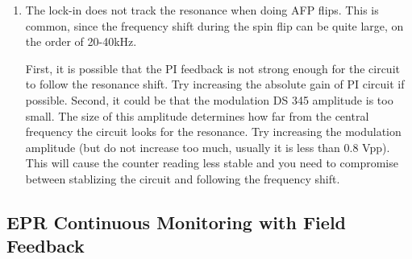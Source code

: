 {\begin{enumerate}
First, it is possible that
the frequency to which you are locked is not the true resonance, or
you are completely out of resonance region.
The solution is again to find manually the resonance, looking for the
most pronounced signal.  

	The problem could also be caused by a wrong lock-in amplifier phase.
Please refer to Section \ref{sec:eprfms}.

	Finally, it could be that the PI Feedback box is improperly set. 
Adjust the gains until the lock-in becomes more stable.  
Admittedly this method is not very quantitative.
Based on experience, at high polarization ($>$40\%), both gains should be adjusted 
anti-clockwisely nearly to the end.  At lower polarization ($\sim$20\%), both gains should
be adjusted by about 4$\sim$5 turns clockwisely.
These numbers may also vary at a higher or lower EPR D2 signal amplitude.

You may also optimize the PI circuit gains by observing how fast the circuit 
follows the resonance.  When counter reading is stablized,
change Wavetek frequency manually by 0.04 MHz (which is close to the real jump
during sweeping, at a target polarization $\sim$ 40\%).  If the counter goes back 
to resonance in roughly 3$~$5 seconds, then the
circuit is working well.  If less than 2 seconds and counter reading is not stable, 
decrease both the relative and absolute gain.  If longer than 6 seconds or lose the 
signal, increase both the relative and absolute gain. 

\item The lock-in does not track the resonance when doing AFP flips.
This is common, since the frequency shift during the spin flip can be
quite large, on the order of 20-40kHz.  

	First, it is possible that the PI feedback is not strong enough for the circuit
to follow the resonance shift.  Try increasing the absolute gain of PI circuit
if possible.
	Second, it could be that the modulation DS 345 amplitude is too small.  The
size of this amplitude determines how far from the central frequency the circuit 
looks for the resonance.   Try increasing the modulation amplitude (but do not increase 
too much, usually it is less than 0.8 Vpp).  This will cause
the counter reading less stable and you need to compromise between stablizing the
circuit and following the frequency shift.


\end{enumerate}


\subsection{EPR Continuous Monitoring with Field Feedback}  
  
}
